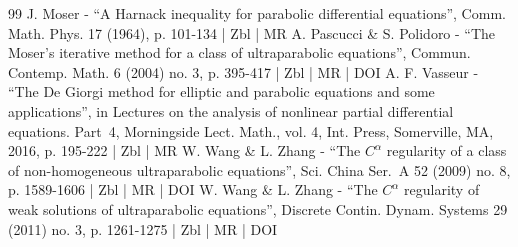 \documentclass[10pt]{amsart}
\theoremstyle{definition}
\theoremstyle{remark}
\begin{document}
\begin{thebibliography}{99}
J. Moser - “A Harnack inequality for parabolic differential equations”, Comm. Math. Phys. 17 (1964), p. 101-134 | Zbl | MR
A. Pascucci \& S. Polidoro - “The Moser’s iterative method for a class of ultraparabolic equations”, Commun. Contemp. Math. 6 (2004) no. 3, p. 395-417 | Zbl | MR | DOI
A. F. Vasseur - “The De Giorgi method for elliptic and parabolic equations and some applications”, in Lectures on the analysis of nonlinear partial differential equations. Part 4, Morningside Lect. Math., vol. 4, Int. Press, Somerville, MA, 2016, p. 195-222 | Zbl | MR
W. Wang \& L. Zhang - “The $C^\alpha $ regularity of a class of non-homogeneous ultraparabolic equations”, Sci. China Ser. A 52 (2009) no. 8, p. 1589-1606 | Zbl | MR | DOI
W. Wang \& L. Zhang - “The $C^\alpha $ regularity of weak solutions of ultraparabolic equations”, Discrete Contin. Dynam. Systems 29 (2011) no. 3, p. 1261-1275 | Zbl | MR | DOI
\end{thebibliography}
\end{document}
